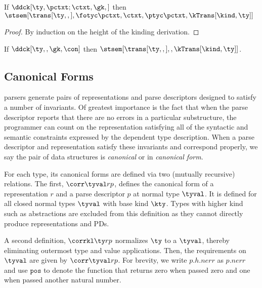 \begin{lemma}
\label{lem:type-correctness}
If $\ddck[\ty,{\pctxt;\ctxt},\gk,{}]$ then
$\stsem[{\trans[\ty,,]},{\fotyc \pctxt, \ctxt,\ptyc \pctxt},
{\kTrans[\kind,\ty]}]$
\end{lemma}

\begin{proof}
  By induction on the height of the kinding derivation. 
\end{proof}

\begin{theorem}
\label{thm:type-correctness}
  If $\ddck[\ty,,\gk,\con]$ then
  $\stsem[{\trans[\ty,,]},,\kTrans[\kind,\ty]]$.
\end{theorem}

\subsection{Canonical Forms}

\ddc{} parsers generate pairs of representations and parse descriptors
designed to satisfy a number of invariants.  Of greatest importance is
the fact that when the parse descriptor reports that there are no errors in a
particular substructure, the programmer can count on the
representation satisfying all of the syntactic and semantic
constraints expressed by the dependent \ddc{} type description.  When
a parse descriptor and representation satisfy these invariants and
correspond properly, we say the pair of data structures is {\em
  canonical} or in {\em canonical form}.

For each \ddc{} type, its canonical forms are defined via two
(mutually recursive) relations.  The first, $\corr \tyval r p$,
defines the canonical form of a representation $r$ and a parse
descriptor $p$ at normal type $\tyval$.  It is defined for all closed
normal types $\tyval$ with base kind $\kty$.  Types with higher kind
such as abstractions are excluded from this definition as they cannot
directly produce representations and PDs.

A second definition, $\corrkl \ty r p$ normalizes $\ty$ to a $\tyval$,
thereby eliminating outermost type and value applications. Then, the
requirements on $\tyval$ are given by $\corr \tyval r p$.  For
brevity, we write $p.h.{nerr}$ as $p.{nerr}$ and use $\mathtt{pos}$ to
denote the function that returns zero when passed zero and one when
passed another natural number.

